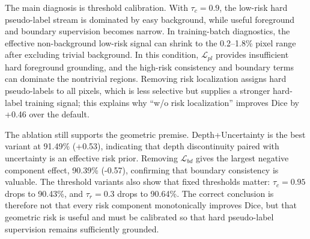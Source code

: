 \documentclass[journal]{IEEEtran}
\begin{document}
The main diagnosis is threshold calibration. With $\tau_c=0.9$, the low-risk hard pseudo-label stream is dominated by easy background, while useful foreground and boundary supervision becomes narrow. In training-batch diagnostics, the effective non-background low-risk signal can shrink to the 0.2--1.8\% pixel range after excluding trivial background. In this condition, $\mathcal{L}_{pl}$ provides insufficient hard foreground grounding, and the high-risk consistency and boundary terms can dominate the nontrivial regions. Removing risk localization assigns hard pseudo-labels to all pixels, which is less selective but supplies a stronger hard-label training signal; this explains why ``w/o risk localization'' improves Dice by +0.46 over the default.

The ablation still supports the geometric premise. Depth+Uncertainty is the best variant at 91.49\% (+0.53), indicating that depth discontinuity paired with uncertainty is an effective risk prior. Removing $\mathcal{L}_{bd}$ gives the largest negative component effect, 90.39\% (-0.57), confirming that boundary consistency is valuable. The threshold variants also show that fixed thresholds matter: $\tau_c=0.95$ drops to 90.43\%, and $\tau_r=0.3$ drops to 90.64\%. The correct conclusion is therefore not that every risk component monotonically improves Dice, but that geometric risk is useful and must be calibrated so that hard pseudo-label supervision remains sufficiently grounded.
\end{document}
